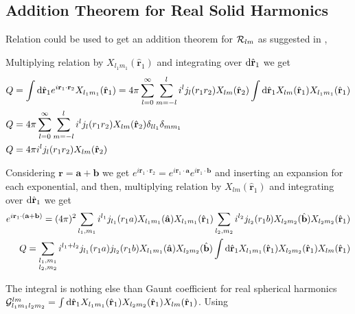 \subsection[Addition Theorem ...]{Addition Theorem for Real Solid Harmonics}
\par{Relation  could be used to get an addition theorem for
  $\mathcal{R}_{lm}$ as suggested in \citep{Chakrabarti95},\citep{Deb83}}
\par{Multiplying relation  by $X_{l_1m_1}(\hat{\bm{r}}_1)$ and
  integrating over $\text{d} \hat{{\bf r}}_1$ we get}
\begin{equation}
\label{part1}
\begin{split}
Q&=\int \text{d} \hat{{\bf r}}_1
e^{i{\bf r}_1\cdot{\bf r}_2}X_{l_1m_1}(\hat{{\bf r}}_1)=4\pi\sum_{l=0}^{\infty}\sum_{m=-l}^{l}i^lj_l(r_1r_2)X_{lm}(\hat{{\bf r}}_2)\int \text{d} \hat{{\bf r}}_1
X_{lm}(\hat{{\bf r}}_1)X_{l_1m_1}(\hat{{\bf r}}_1)\\
Q&=4\pi\sum_{l=0}^{\infty}\sum_{m=-l}^{l}i^lj_l(r_1r_2)X_{lm}(\hat{{\bf r}}_2)\delta_{ll_1}\delta_{mm_1}\\
Q&=4\pi i^lj_l(r_1r_2)X_{lm}(\hat{{\bf r}}_2)
\end{split}
\end{equation}
\par{Considering $\bm{r}=\bm{a}+\bm{b}$ we get
$e^{i\bm{r}_1\cdot\bm{r}_2}=e^{i\bm{r}_1\cdot\bm{a}}e^{i\bm{r}_1\cdot\bm{b}}$
and inserting an expansion  for each exponential, and then,
multiplying relation by $X_{lm}(\hat{\bm{r}}_1)$ and integrating over $\text{d} \hat{{\bf r}}_1$ we get}
\begin{equation}
\begin{split}
e^{i{\bf r}_1\cdot({\bf a}+{\bf b})}=(4\pi)^2\sum_{l_1,m_1}i^{l_1}j_{l_1}(r_1a)X_{l_1m_1}(\hat{{\bf a}})X_{l_1m_1}(\hat{{\bf r}}_1)\sum_{l_2,m_2}i^{l_2}j_{l_2}(r_1b)X_{l_2m_2}(\hat{{\bf b}})X_{l_2m_2}(\hat{{\bf r}}_1)\\
Q=\sum_{\begin{subarray}{l}l_1,m_1\\
l_2,m_2
\end{subarray}
}i^{l_1+l_2}j_{l_1}(r_1a)j_{l_2}(r_1b)X_{l_1m_1}(\hat{{\bf a}})X_{l_2m_2}(\hat{{\bf b}})\int
\text{d} \hat{{\bf r}}_1 X_{l_1m_1}(\hat{{\bf r}}_1)X_{l_2m_2}(\hat{{\bf r}}_1)X_{lm}(\hat{{\bf r}}_1)
\end{split}
\end{equation}
\par{The integral is nothing else than Gaunt coefficient for real spherical
  harmonics $\mathcal{G}_{l_1m_1l_2m_2}^{lm}=\int \text{d} \hat{{\bf r}}_1
  X_{l_1m_1}(\hat{{\bf r}}_1)X_{l_2m_2}(\hat{{\bf r}}_1)X_{lm}(\hat{{\bf r}}_1)$.
  Using }
